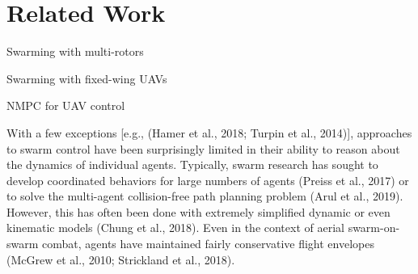 \section{Related Work}

Swarming with multi-rotors

Swarming with fixed-wing UAVs

NMPC for UAV control

With a few exceptions [e.g., (Hamer et al., 2018; Turpin et al., 2014)], approaches to swarm control
have been surprisingly limited in their ability to reason about the dynamics of individual agents.
Typically, swarm research has sought to develop coordinated behaviors for large numbers of agents
(Preiss et al., 2017) or to solve the multi-agent collision-free path planning problem (Arul et al.,
2019). However, this has often been done with extremely simplified dynamic or even kinematic
models (Chung et al., 2018). Even in the context of aerial swarm-on-swarm combat, agents have
maintained fairly conservative flight envelopes (McGrew et al., 2010; Strickland et al., 2018).
